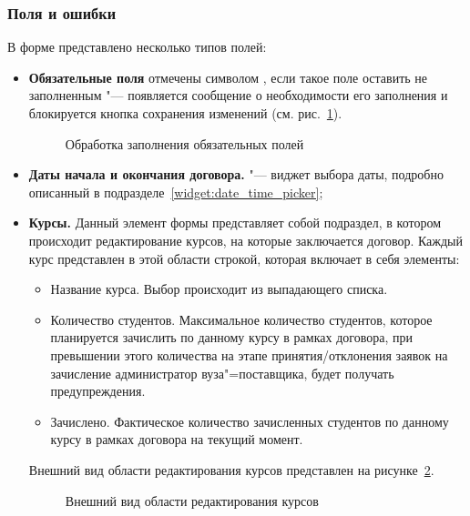 \subsubsection{Поля и ошибки}
В форме представлено несколько типов полей:
	\begin{itemize}
		\item \textbf{Обязательные поля} отмечены символом \quotes{*}, если такое поле оставить не заполненным "--- появляется сообщение о необходимости его заполнения и блокируется кнопка сохранения изменений (см. рис.~\ref{agreement:edit_required}).
		
		\begin{figure}[H]
		\caption{Обработка заполнения обязательных полей}
		\label{agreement:edit_required}
		\end{figure}	
		
		\item \textbf{Даты начала и окончания договора.} "--- виджет выбора даты, подробно описанный в подразделе~\ref{widget:date_time_picker};
		\item \textbf{Курсы.} Данный элемент формы представляет собой подраздел, в котором происходит редактирование курсов, на которые заключается договор. Каждый курс представлен в этой области строкой, которая включает в себя элементы:
		\begin{itemize}
			\item Название курса. Выбор происходит из выпадающего списка.
			\item Количество студентов. Максимальное количество студентов, которое планируется зачислить по данному курсу в рамках договора, при превышении этого количества на этапе принятия/отклонения заявок на зачисление администратор вуза"=поставщика, будет получать предупреждения.
			\item Зачислено. Фактическое количество зачисленных студентов по данному курсу в рамках договора на текущий момент.
		\end{itemize}
		Внешний вид области редактирования курсов представлен на рисунке~\ref{agreement:edit_course}.
		\begin{figure}[H]
		\caption{Внешний вид области редактирования курсов}
		\label{agreement:edit_course}
		\end{figure}	
		

\end{itemize}

